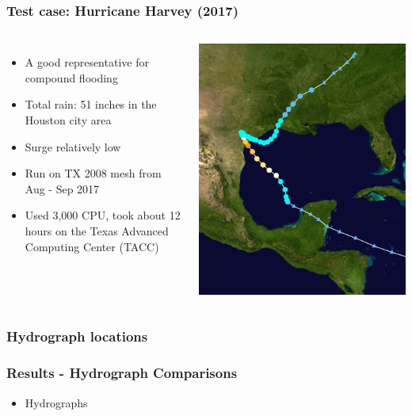 \documentclass[10pt]{oden_beamer}
\begin{document}
\begin{frame}
  \frametitle{Test case: Hurricane Harvey (2017)}
  \begin{columns}
  \begin{itemize}
  \item A good representative for compound flooding
  \item Total rain: 51 inches in the Houston city area
  \item Surge relatively low
  \item Run on TX 2008 mesh from Aug - Sep 2017
  \item Used 3,000 CPU, took about 12 hours on the Texas Advanced Computing Center (TACC)
  \end{itemize}

  \centering
  \includegraphics[width=0.8\linewidth]{harvey_cropped.png}
  \end{columns}

\end{frame}


\begin{frame}
  \frametitle{Hydrograph locations}
\end{frame}

\begin{frame}
  \frametitle{Results - Hydrograph Comparisons}
  \begin{itemize}
  \item Hydrographs
  \end{itemize}
\end{frame}
\end{document}
